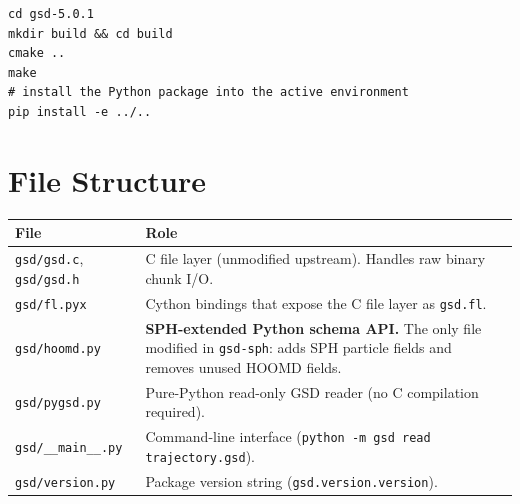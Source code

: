 \documentclass[10pt,a4paper]{article}
\begin{document}
\begin{lstlisting}[style=bash]
cd gsd-5.0.1
mkdir build && cd build
cmake ..
make
# install the Python package into the active environment
pip install -e ../..
\end{lstlisting}

\section{File Structure}

\begin{center}
\small
\begin{tabular}{@{}lp{9cm}@{}}
\toprule
\textbf{File} & \textbf{Role}\\
\midrule
\texttt{gsd/gsd.c}, \texttt{gsd/gsd.h}
  & C file layer (unmodified upstream). Handles raw binary chunk I/O.\\
\texttt{gsd/fl.pyx}
  & Cython bindings that expose the C file layer as \texttt{gsd.fl}.\\
\texttt{gsd/hoomd.py}
  & \textbf{SPH-extended Python schema API.} The only file modified in
    \texttt{gsd-sph}: adds SPH particle fields and removes unused HOOMD fields.\\
\texttt{gsd/pygsd.py}
  & Pure-Python read-only GSD reader (no C compilation required).\\
\texttt{gsd/\_\_main\_\_.py}
  & Command-line interface (\texttt{python -m gsd read trajectory.gsd}).\\
\texttt{gsd/version.py}
  & Package version string (\texttt{gsd.version.version}).\\
\bottomrule
\end{tabular}
\end{center}
\end{document}
